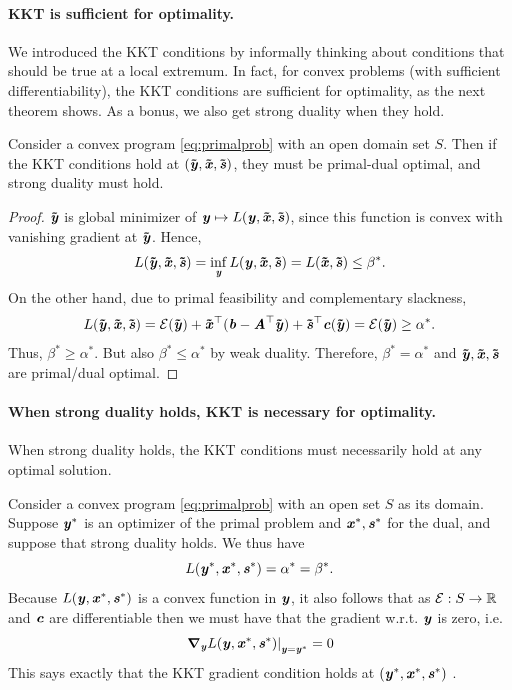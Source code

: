 {\paragraph{KKT is sufficient for optimality.}
We introduced the KKT conditions by informally thinking about
conditions that should be true at a local extremum.
In fact, for convex problems (with sufficient differentiability), the
KKT conditions are sufficient for optimality, as the
next theorem shows.
As a bonus, we also get strong duality when they hold.
\begin{theorem}
  \label{thm:KKTsufficient}
   Consider a convex program \eqref{eq:primalprob} with an open domain
  set $S$.
   Then if the KKT conditions hold at $(\yytil,\xxtil,\sstil)$, they must be
   primal-dual optimal, and strong duality must hold.
\end{theorem}
\begin{proof}
  $\yytil$ is global minimizer of $\yy \mapsto L(\yy, \xxtil, \sstil)$, since this function is convex with vanishing gradient at $\yytil$. Hence,
  \[ L(\yytil, \xxtil, \sstil) = \inf_{\yy} L(\yy, \xxtil, \sstil) = L(\xxtil,\sstil) \leq \beta^*. \]
  On the other hand, due to primal feasibility and complementary slackness,
  \[ L(\yytil,\xxtil,\sstil) = \calE(\yytil) + \xxtil^\trp(\bb-\AA^\trp\yytil) + \sstil^\trp\cc(\yytil) = \calE(\yytil) \geq \alpha^*. \]
  Thus, $\beta^*\geq\alpha^*$. But also $\beta^*\leq\alpha^*$ by weak duality. Therefore, $\beta^*=\alpha^*$ and $\yytil,\xxtil,\sstil$ are primal/dual optimal.
\end{proof}

\paragraph{When strong duality holds, KKT is necessary for
  optimality.}
When strong duality holds, the KKT conditions must necessarily hold at
any optimal solution.

 Consider a convex program \eqref{eq:primalprob} with an open set $S$
 as its domain.
Suppose $\yy^*$ is an optimizer of the primal problem and $\xx^*,
\ss^*$ for the dual, and suppose that strong duality holds.
We thus have
\[ L(\yy^*, \xx^*, \ss^*) = \alpha^* = \beta^*. \]
Because $L(\yy, \xx^*, \ss^*)$ is a convex function in $\yy$, it also
follows that as $\energy: S \to \R$ and $\cc$ are differentiable then we must have that the
gradient w.r.t. $\yy$ is zero, i.e.
\begin{equation}
  \left.\grad_{\yy}L(\yy, \xx^*,
    \ss^*)\right|_{\yy=\yy^*} = 0
  \label{eq:KKTgradAtOpt}
\end{equation}
This says exactly that the KKT gradient condition holds at $(\yy^*, \xx^*, \ss^*)$ .

}

